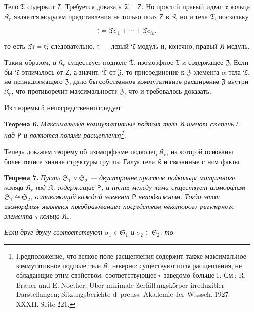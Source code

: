\documentclass[11pt]{article}
\newcommand{\srcfn}[2]{\footnote{#2}}
\begin{document}
Тело \(\mathfrak T\) содержит \(\mathsf{Z}\). Требуется доказать \(\mathfrak T=\mathsf{Z}\). Но простой правый идеал \(\mathfrak r\) кольца \(\mathfrak K_r\) является модулем представления не только поля \(\mathsf{Z}\) в \(\mathfrak K\), но и тела \(\mathfrak T\), поскольку

\[
\mathfrak r=\mathfrak T c_{i1}+\cdots+\mathfrak T c_{ik},
\]

то есть \(\mathfrak T\mathfrak r=\mathfrak r\); следовательно, \(\mathfrak r\) --- левый \(\mathfrak T\)-модуль и, конечно, правый \(\mathfrak K\)-модуль.

Таким образом, в \(\mathfrak K_r\) существует подполе \(\overline{\mathfrak T}\), изоморфное \(\mathfrak T\) и содержащее \(\mathfrak Z\). Если бы \(\mathfrak T\) отличалось от \(\mathsf{Z}\), а значит, \(\overline{\mathfrak T}\) от \(\mathfrak Z\), то присоединение к \(\mathfrak Z\) элемента \(\alpha\) тела \(\mathfrak T\), не принадлежащего \(\mathfrak Z\), дало бы собственное коммутативное расширение \(\mathfrak Z\) внутри \(\mathfrak K_r\), что противоречит максимальности \(\mathfrak Z\), что и требовалось доказать.

Из теоремы 5 непосредственно следует

\textbf{Теорема 6.} \emph{Максимальные коммутативные подполя тела \(\mathfrak K\) имеют степень \(t\) над \(\mathsf P\) и являются полями расщепления\srcfn{1}{Предположение, что всякое поле расщепления содержит также максимальное коммутативное подполе тела \(\mathfrak K\), неверно: существуют поля расщепления, не обладающие этим свойством; соответствующее \(r\) заведомо больше 1. См.: R. Brauer und E. Noether, Über minimale Zerfällungskörper irreduzibler Darstellungen; Sitzungsberichte d. preuss. Akademie der Wisssch. 1927 XXXII, Seite 221.}.}

Теперь докажем теорему об изоморфизме подколец \(\mathfrak K_r\), на которой основаны более точное знание структуры группы Галуа тела \(\mathfrak K\) и связанные с ним факты.

\textbf{Теорема 7.} \emph{Пусть \(\mathfrak S_1\) и \(\mathfrak S_2\) --- двусторонне простые подкольца матричного кольца \(\mathfrak K_r\) над \(\mathfrak K\), содержащие \(\mathsf P\), и пусть между ними существует изоморфизм \(\mathfrak S_1\cong\mathfrak S_2\), оставляющий каждый элемент \(\mathsf P\) неподвижным. Тогда этот изоморфизм является преобразованием посредством некоторого регулярного элемента \(\tau\) кольца \(\mathfrak K_r\).}

\emph{Если друг другу соответствуют \(\sigma_1\in\mathfrak S_1\) и \(\sigma_2\in\mathfrak S_2\), то}
\end{document}
